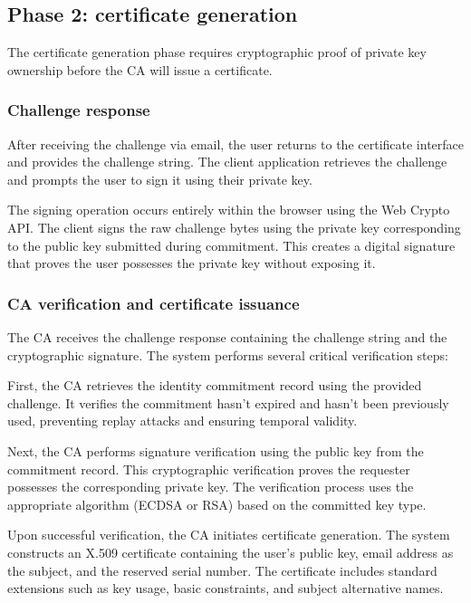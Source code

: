 \subsection{Phase 2: certificate generation}

The certificate generation phase requires cryptographic proof of private key 
ownership before the CA will issue a certificate.

\subsubsection{Challenge response}

After receiving the challenge via email, the user returns to the certificate 
interface and provides the challenge string. The client application retrieves 
the challenge and prompts the user to sign it using their private key.

The signing operation occurs entirely within the browser using the Web Crypto API. 
The client signs the raw challenge bytes using the private key corresponding to 
the public key submitted during commitment. This creates a digital signature 
that proves the user possesses the private key without exposing it.

\subsubsection{CA verification and certificate issuance}

The CA receives the challenge response containing the challenge string and the 
cryptographic signature. The system performs several critical verification steps:

First, the CA retrieves the identity commitment record using the provided challenge. 
It verifies the commitment hasn't expired and hasn't been previously used, 
preventing replay attacks and ensuring temporal validity.

Next, the CA performs signature verification using the public key from the 
commitment record. This cryptographic verification proves the requester possesses 
the corresponding private key. The verification process uses the appropriate 
algorithm (ECDSA or RSA) based on the committed key type.

Upon successful verification, the CA initiates certificate generation. The system 
constructs an X.509 certificate containing the user's public key, email address 
as the subject, and the reserved serial number. The certificate includes standard 
extensions such as key usage, basic constraints, and subject alternative names.

